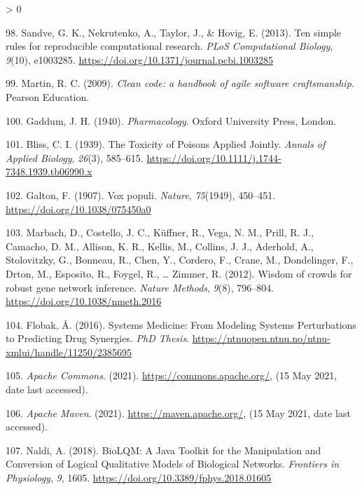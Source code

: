 \documentclass[
  12pt,
]{book}
\newlength{\cslhangindent}
\newenvironment{CSLReferences}[2] %
 {%
  \setlength{\parindent}{0pt}
  \ifodd #1 \everypar{\setlength{\hangindent}{\cslhangindent}}\ignorespaces\fi
  \ifnum #2 > 0
  \setlength{\parskip}{#2\baselineskip}
  \fi
 }%
 {}
\begin{document}
\begin{CSLReferences}{1}{0}
\leavevmode\hypertarget{ref-Sandve2013}{}%
98. Sandve, G. K., Nekrutenko, A., Taylor, J., \& Hovig, E. (2013). {Ten simple rules for reproducible computational research}. \emph{PLoS Computational Biology}, \emph{9}(10), e1003285. \url{https://doi.org/10.1371/journal.pcbi.1003285}

\leavevmode\hypertarget{ref-Martin2009}{}%
99. Martin, R. C. (2009). \emph{{Clean code: a handbook of agile software craftsmanship}}. Pearson Education.

\leavevmode\hypertarget{ref-gaddum1940pharmacology}{}%
100. Gaddum, J. H. (1940). \emph{{Pharmacology}}. Oxford University Press, London.

\leavevmode\hypertarget{ref-Bliss1939}{}%
101. Bliss, C. I. (1939). {The Toxicity of Poisons Applied Jointly}. \emph{Annals of Applied Biology}, \emph{26}(3), 585--615. \url{https://doi.org/10.1111/j.1744-7348.1939.tb06990.x}

\leavevmode\hypertarget{ref-Galton1907}{}%
102. Galton, F. (1907). {Vox populi}. \emph{Nature}, \emph{75}(1949), 450--451. \url{https://doi.org/10.1038/075450a0}

\leavevmode\hypertarget{ref-Marbach2012}{}%
103. Marbach, D., Costello, J. C., Küffner, R., Vega, N. M., Prill, R. J., Camacho, D. M., Allison, K. R., Kellis, M., Collins, J. J., Aderhold, A., Stolovitzky, G., Bonneau, R., Chen, Y., Cordero, F., Crane, M., Dondelinger, F., Drton, M., Esposito, R., Foygel, R., \ldots{} Zimmer, R. (2012). {Wisdom of crowds for robust gene network inference}. \emph{Nature Methods}, \emph{9}(8), 796--804. \url{https://doi.org/10.1038/nmeth.2016}

\leavevmode\hypertarget{ref-Flobak2016}{}%
104. Flobak, Å. (2016). {Systems Medicine: From Modeling Systems Perturbations to Predicting Drug Synergies}. \emph{PhD Thesis}. \url{https://ntnuopen.ntnu.no/ntnu-xmlui/handle/11250/2385695}

\leavevmode\hypertarget{ref-ApacheCommons}{}%
105. \emph{{Apache Commons}}. (2021). \url{https://commons.apache.org/}, (15 May 2021, date last accessed).

\leavevmode\hypertarget{ref-Maven}{}%
106. \emph{{Apache Maven}}. (2021). \url{https://maven.apache.org/}, (15 May 2021, date last accessed).

\leavevmode\hypertarget{ref-Naldi2018}{}%
107. Naldi, A. (2018). {BioLQM: A Java Toolkit for the Manipulation and Conversion of Logical Qualitative Models of Biological Networks}. \emph{Frontiers in Physiology}, \emph{9}, 1605. \url{https://doi.org/10.3389/fphys.2018.01605}


\end{CSLReferences}
\end{document}
